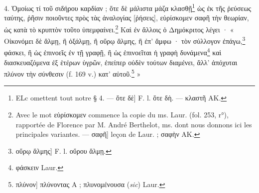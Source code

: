 \documentclass[landscape, a4paper, 11pt, oneside, polutonikogreek, french]{article}
\begin{document}
4. Ὁμοίως τί τοῦ σιδήρου καρδίαν ; ὅτε δὲ μάλιστα μάζα κλασθῇ\footnote{ELc omettent tout notre § 4. --- ὅτε δὲ] F. l. ὅτε δὴ. --- κλαστῆ AΚ.} ὡς ἐκ τῆς ῥεύσεως ταύτης, ῥῆσιν ποιοῦντες πρὸς τὰς ἀναλογίας [ῥήσεις], εὑρίσκομεν σαφῆ τὴν θεωρίαν, ὡς κατὰ τὸ κρυπτὸν τοῦτο ὑπεμφαίνει.\footnote{Avec le mot εὑρίσκομεν commence la copie du ms. Laur. (fol. 253, r°), rapportée de Florence par M. André Berthelot, ms. dont nous donnons ici les principales variantes. --- σαφῆ] leçon de Laur. ; σαφὴν AK.} Καὶ ἐν ἄλλοις ὁ Δημόκριτος λέγει · « Οἰκονόμει δὲ ἅλμῃ, ἢ ὀξάλμῃ, ἢ οὔρῳ ἅλμης, ἢ ἐπ' ἄμφω · τὸν σύλλογον ἐπάγω,\footnote{οὔρῳ ἅλμης] F. l. οὔρου ἅλμῃ.} φάσκει, ἢ ὡς ἐπινοεῖς ἐν τῇ γραφῇ, ἢ ὡς ἐπινοεῖται ἡ γραφὴ δυνάμενα\footnote{φάσκειν Laur.} καὶ διασκευαζόμενα ἐξ ἑτέρων ὑγρῶν, ἐπείπερ οὐδὲν τούτων διαμένει, ἄλλ' ἀπόχυται πλύνον τὴν σύνθεσιν (f. 169 v.) κατ' αὐτοῦ.\footnote{πλύνον] πλύνοντας A ; πλυνομένουσα (\emph{sic}) Laur.} »
\end{document}
